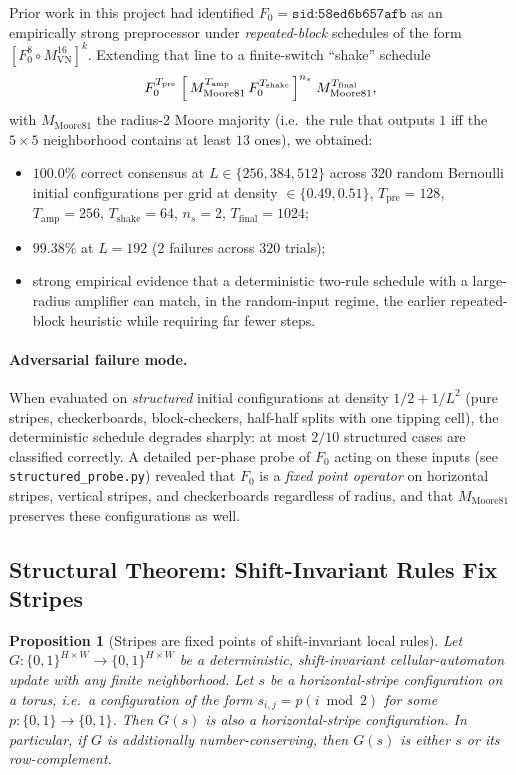 \documentclass[11pt,a4paper]{article}
\newtheorem{proposition}{Proposition}
\newcommand{\sid}[1]{\texttt{sid:}\allowbreak\texttt{#1}}
\begin{document}
Prior work in this project had identified
\(F_0 = \sid{58ed6b657afb}\) as an empirically strong preprocessor under
\emph{repeated-block} schedules of the form \([F_0^8 \circ M_{\mathrm{VN}}^{16}]^k\).
Extending that line to a finite-switch ``shake'' schedule
\[
F_0^{T_{\mathrm{pre}}}
\;\Bigl[\,M_{\mathrm{Moore81}}^{T_{\mathrm{amp}}}\,F_0^{T_{\mathrm{shake}}}\,\Bigr]^{n_s}
\;M_{\mathrm{Moore81}}^{T_{\mathrm{final}}},
\]
with \(M_{\mathrm{Moore81}}\) the radius-2 Moore majority (i.e.\ the rule that
outputs \(1\) iff the \(5{\times}5\) neighborhood contains at least \(13\) ones),
we obtained:
\begin{itemize}
\item \(100.0\%\) correct consensus at \(L\in\{256,384,512\}\) across
\(320\) random Bernoulli initial configurations per grid at density
\(\in\{0.49, 0.51\}\), \(T_{\mathrm{pre}}=128\), \(T_{\mathrm{amp}}=256\),
\(T_{\mathrm{shake}}=64\), \(n_s=2\), \(T_{\mathrm{final}}=1024\);
\item \(99.38\%\) at \(L=192\) (\(2\) failures across \(320\) trials);
\item strong empirical evidence that a deterministic two-rule schedule with a
large-radius amplifier can match, in the random-input regime, the earlier
repeated-block heuristic while requiring far fewer steps.
\end{itemize}

\paragraph{Adversarial failure mode.}
When evaluated on \emph{structured} initial configurations at density
\(1/2+1/L^2\) (pure stripes, checkerboards, block-checkers, half-half splits
with one tipping cell), the deterministic schedule degrades sharply:
at most \(2/10\) structured cases are classified correctly.  A detailed
per-phase probe of \(F_0\) acting on these inputs (see
\texttt{structured\_probe.py}) revealed that \(F_0\) is a \emph{fixed point
operator} on horizontal stripes, vertical stripes, and checkerboards
regardless of radius, and that \(M_{\mathrm{Moore81}}\) preserves these
configurations as well.

\subsection{Structural Theorem: Shift-Invariant Rules Fix Stripes}
\label{subsec:stripe-theorem}

\begin{proposition}[Stripes are fixed points of shift-invariant local rules]
\label{prop:stripe}
Let \(G:\{0,1\}^{H\times W}\to\{0,1\}^{H\times W}\) be a deterministic,
shift-invariant cellular-automaton update with any finite neighborhood.
Let \(s\) be a horizontal-stripe configuration on a torus, i.e.\ a
configuration of the form \(s_{i,j} = p(i \bmod 2)\) for some \(p:\{0,1\}\to
\{0,1\}\).  Then \(G(s)\) is also a horizontal-stripe configuration.  In
particular, if \(G\) is additionally number-conserving, then \(G(s)\) is
either \(s\) or its row-complement.
\end{proposition}
\end{document}
